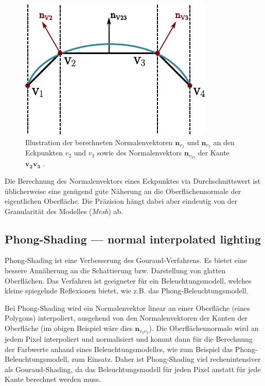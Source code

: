 \begin{figure}[H]
    \centering
    \includegraphics{img/shading_mesh_normals.pdf}
    \caption{Illustration der berechneten Normalenvektoren $\bm{n}_{v_{2}}$ und
    $\bm{n}_{v_{3}}$ an den Eckpunkten $v_{2}$ und $v_{3}$ sowie des
    Normalenvektors $\bm{n}_{v_{23}}$ der Kante $\bm{v_{2}v_{3}}$
    \protect\footnotemark.}\label{fig:gouraud_shading_normals_illustration}
\end{figure}

Die Berechnung des Normalenvektors eines Eckpunktes via Durchschnittswert ist
üblicherweise eine genügend gute Näherung an die Oberflächennormale der
eigentlichen Oberfläche. Die Präzision hängt dabei aber eindeutig von der
Granularität des Modelles (\textit{Mesh}) ab.

\subsection{Phong-Shading --- normal interpolated lighting}
\label{subsec:phong_shading}

Phong-Shading ist eine Verbesserung des Gouraud-Verfahrens. Es bietet
eine bessere Annäherung an die Schattierung bzw. Darstellung von glatten
Oberflächen. Das Verfahren ist geeigneter für ein Beleuchtungsmodell,
welches kleine spiegelnde Reflexionen bietet, wie z.B. das
Phong-Beleuchtungsmodell.

Bei Phong-Shading wird ein Normalenvektor linear an einer Oberfläche
(eines Polygons) interpoliert, ausgehend von den Normalenvektoren der
Kanten der Oberfläche (im obigen Beispiel wäre dies
$\bm{n}_{v_{2}v_{3}}$). Die Oberflächennormale wird an jedem Pixel
interpoliert und normalisiert und kommt dann für die Berechnung der
Farbwerte anhand eines Beleuchtungsmodelles, wie zum Beispiel das
Phong-Beleuchtungsmodell, zum Einsatz. Daher ist Phong-Shading viel
rechenintensiver als Gouraud-Shading, da das Beleuchtungsmodell für
jeden Pixel anstatt für jede Kante berechnet werden muss.


